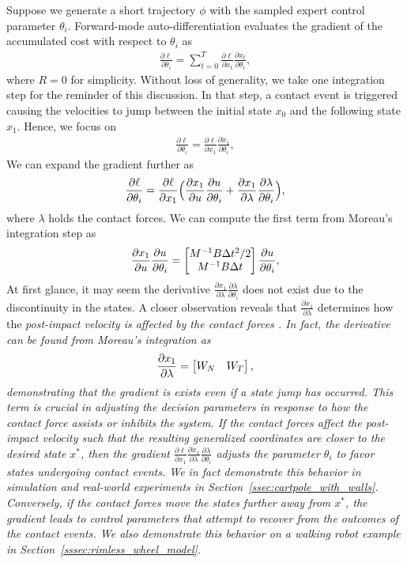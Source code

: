 Suppose we generate a short trajectory $\phi$ with the sampled expert control
parameter $\theta_i$.
%
Forward-mode auto-differentiation evaluates the gradient of the accumulated cost
with respect to $\theta_i$ as 
\begin{align*}
    \frac{\partial \ell}{\partial \theta_i} = \sum_{t=0}^{T} \frac{\partial \ell}{\partial x_t} \frac{\partial x_t}{\partial \theta_i} ,
\end{align*}
\noindent where $R=0$ for simplicity.
%
Without loss of generality, we take one integration step for the reminder of
this discussion. 
%
In that step, a contact event is triggered causing the velocities to jump
between the initial state $x_0$ and the following state $x_1$. 
%
Hence, we focus on 
\begin{align*}
    \frac{\partial \ell}{\partial \theta_i} = \frac{\partial \ell}{\partial x_1} \frac{\partial x_1}{\partial \theta_i},
\end{align*}
%
We can expand the gradient further as 
\begin{align*}
    \frac{\partial \ell}{\partial \theta_i} = \frac{\partial \ell}{\partial x_1} \Bigl( \frac{\partial x_1}{\partial u} \frac{\partial u}{\partial \theta_i} + \frac{\partial x_1}{\partial \lambda}\frac{\partial \lambda}{\partial \theta_i}\Bigr),
\end{align*}
\noindent where $\lambda$ holds the contact forces.
%
We can compute the first term from Moreau's integration step as
\begin{align*}
    \frac{\partial x_1}{\partial u} \frac{\partial u}{\partial \theta_i} = 
    \begin{bmatrix}M^{-1}B \Delta t^2/2 \\ M^{-1}B \Delta t\end{bmatrix} \frac{\partial u}{\partial \theta_i},
\end{align*} 
%
At first glance, it may seem the derivative $\frac{\partial x_1}{\partial
\lambda}\frac{\partial \lambda}{\partial \theta_i}$ does not exist due to
the discontinuity in the states. 
%
A closer observation reveals that  $\frac{\partial x_1}{\partial \lambda}$
determines how the \it{post-impact velocity is affected by the
contact forces} \normalfont.
%
In fact, the derivative can be found from Moreau's integration as 
\begin{align*}
    \frac{\partial x_1}{\partial \lambda} = \begin{bmatrix}W_N & W_T \end{bmatrix}, 
\end{align*}
%
demonstrating that the gradient is exists even if a state jump has
occurred. 
%
This term is crucial in adjusting the decision parameters in response to how the
contact force assists or inhibits the system.
%
If the contact forces affect the \it{post-impact} \normalfont velocity such that
the resulting generalized coordinates are closer to the desired state $x^*$,
then the gradient $\frac{\partial \ell}{\partial x_1} \frac{\partial
x_1}{\partial \lambda}\frac{\partial \lambda}{\partial \theta_i}$ adjusts the
parameter $\theta_i$ to favor states undergoing contact events. 
%
We in fact demonstrate this behavior in simulation and real-world experiments in
Section~\ref{ssec:cartpole_with_walls}.
%
Conversely, if the contact forces move the states further away from $x^*$, the
gradient leads to control parameters that attempt to recover from the outcomes
of the contact events.
%
We also demonstrate this behavior on a walking robot example in
Section~\ref{sssec:rimless_wheel_model}.